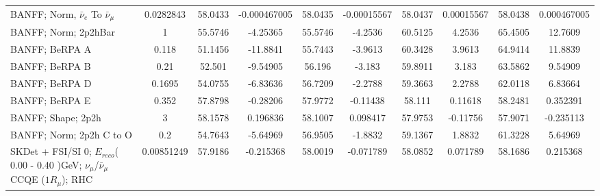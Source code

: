 \begin{tabular}{| l | S | S  S | S  S | S  S | S  S | }
                               BANFF; Norm, $\bar{\nu}_{e}$ To $\bar{\nu}_{\mu}$ &       0.0282843 &         58.0433 &    -0.000467005 &         58.0435 &     -0.00015567 &         58.0437 &      0.00015567 &         58.0438 &     0.000467005 \\ 
                                                            BANFF; Norm; 2p2hBar &               1 &         55.5746 &        -4.25365 &         55.5746 &         -4.2536 &         60.5125 &          4.2536 &         65.4505 &         12.7609 \\ 
                                                                  BANFF; BeRPA A &           0.118 &         51.1456 &        -11.8841 &         55.7443 &         -3.9613 &         60.3428 &          3.9613 &         64.9414 &         11.8839 \\ 
                                                                  BANFF; BeRPA B &            0.21 &          52.501 &        -9.54905 &          56.196 &          -3.183 &         59.8911 &           3.183 &         63.5862 &         9.54909 \\ 
                                                                  BANFF; BeRPA D &          0.1695 &         54.0755 &        -6.83636 &         56.7209 &         -2.2788 &         59.3663 &          2.2788 &         62.0118 &         6.83664 \\ 
                                                                  BANFF; BeRPA E &           0.352 &         57.8798 &        -0.28206 &         57.9772 &        -0.11438 &          58.111 &         0.11618 &         58.2481 &        0.352391 \\ 
                                                              BANFF; Shape; 2p2h &               3 &         58.1578 &        0.196836 &         58.1007 &        0.098417 &         57.9753 &        -0.11756 &         57.9071 &       -0.235113 \\ 
                                                        BANFF; Norm; 2p2h C to O &             0.2 &         54.7643 &        -5.64969 &         56.9505 &         -1.8832 &         59.1367 &          1.8832 &         61.3228 &         5.64969 \\ 
SKDet + FSI/SI  0; $E_{reco}$( 0.00 - 0.40 )GeV; $\nu_{\mu}$/$\bar{\nu}_{\mu}$ CCQE ($1R_{\mu}$); RHC &      0.00851249 &         57.9186 &       -0.215368 &         58.0019 &       -0.071789 &         58.0852 &        0.071789 &         58.1686 &        0.215368 \\ 

\end{tabular}
